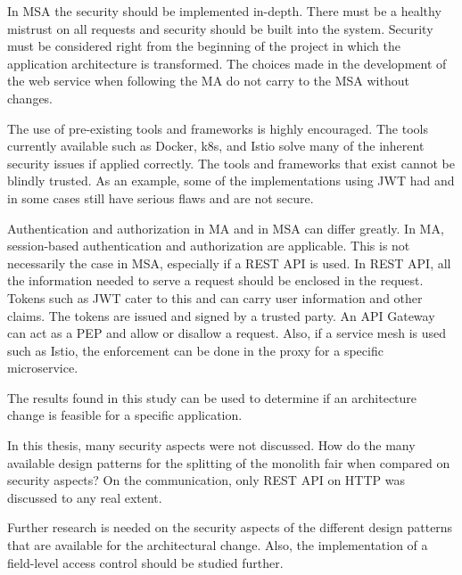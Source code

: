 \begin{sloppypar}
    In MSA the security should be implemented in-depth. There must be a healthy
    mistrust on all requests and security should be built into the system.
    Security must be considered right from the beginning of the project in which
    the application architecture is transformed. The choices made in the
    development of the web service when following the MA do not carry to the MSA
    without changes.
\end{sloppypar}
\begin{sloppypar}
    The use of pre-existing tools and frameworks is highly encouraged. The tools
    currently available such as Docker, k8s, and Istio solve many of the
    inherent security issues if applied correctly. The tools and frameworks that
    exist cannot be blindly trusted. As an example, some of the implementations
    using JWT had and in some cases still have serious flaws and are not secure.
\end{sloppypar}
\begin{sloppypar}
    Authentication and authorization in MA and in MSA can differ greatly. In MA,
    session-based authentication and authorization are applicable. This is not
    necessarily the case in MSA, especially if a REST API is used. In REST API,
    all the information needed to serve a request should be enclosed in the
    request. Tokens such as JWT cater to this and can carry user information and
    other claims. The tokens are issued and signed by a trusted party. An API
    Gateway can act as a PEP and allow or disallow a request. Also, if a service
    mesh is used such as Istio, the enforcement can be done in the proxy for a
    specific microservice.
\end{sloppypar}
\begin{sloppypar}
    The results found in this study can be used to determine if an architecture
    change is feasible for a specific application.
\end{sloppypar}
\begin{sloppypar}
    In this thesis, many security aspects were not discussed. How do the many
    available design patterns for the splitting of the monolith fair when
    compared on security aspects? On the communication, only REST API on HTTP
    was discussed to any real extent.
\end{sloppypar}
\begin{sloppypar}
    Further research is needed on the security aspects of the different design
    patterns that are available for the architectural change. Also, the
    implementation of a field-level access control should be studied further.
\end{sloppypar}

